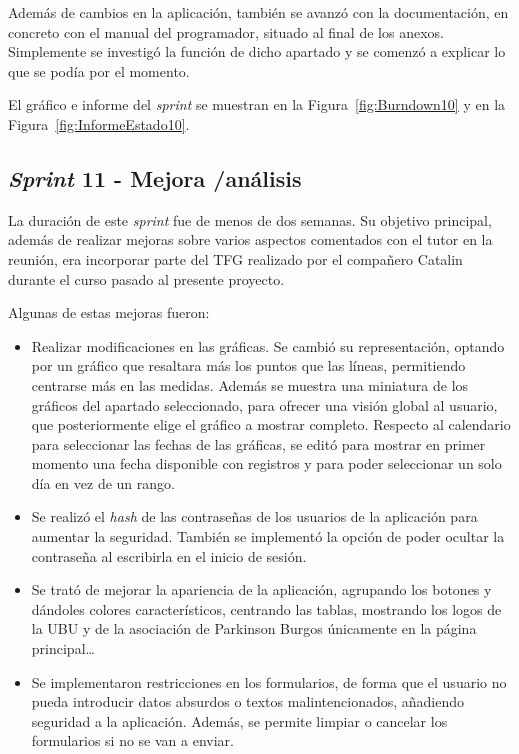 Además de cambios en la aplicación, también se avanzó con la documentación, en concreto con el manual del programador, situado al final de los anexos. Simplemente se investigó la función de dicho apartado y se comenzó a explicar lo que se podía por el momento.

El gráfico e informe del \textit{sprint} se muestran en la Figura~\ref{fig:Burndown10} y en la Figura~\ref{fig:InformeEstado10}.




\subsection{\textit{Sprint} 11 - Mejora /análisis}
La duración de este \textit{sprint} fue de menos de dos semanas. Su objetivo principal, además de realizar mejoras sobre varios aspectos comentados con el tutor en la reunión, era incorporar parte del TFG realizado por el compañero Catalin~\cite{TFGCatalin} durante el curso pasado al presente proyecto.

Algunas de estas mejoras fueron:
\begin{itemize}
    \item Realizar modificaciones en las gráficas. Se cambió su representación, optando por un gráfico que resaltara más los puntos que las líneas, permitiendo centrarse más en las medidas. Además se muestra una miniatura de los gráficos del apartado seleccionado, para ofrecer una visión global al usuario, que posteriormente elige el gráfico a mostrar completo.
    Respecto al calendario para seleccionar las fechas de las gráficas, se editó para mostrar en primer momento una fecha disponible con registros y para poder seleccionar un solo día en vez de un rango.

    \item Se realizó el \textit{hash} de las contraseñas de los usuarios de la aplicación para aumentar la seguridad. También se implementó la opción de poder ocultar la contraseña al escribirla en el inicio de sesión.

    \item Se trató de mejorar la apariencia de la aplicación, agrupando los botones y dándoles colores característicos, centrando las tablas, mostrando los logos de la UBU y de la asociación de Parkinson Burgos únicamente en la página principal\ldots

    \item Se implementaron restricciones en los formularios, de forma que el usuario no pueda introducir datos absurdos o textos malintencionados, añadiendo seguridad a la aplicación. Además, se permite limpiar o cancelar los formularios si no se van a enviar.
\end{itemize}

